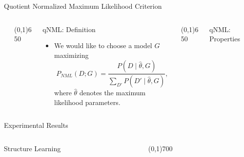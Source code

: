 \documentclass[final]{beamer}
\newcommand{\heading}[1]{\alert{\large #1}\\}
\theoremstyle{plain}
\begin{document}
\begin{frame}{}
\begin{block}{Quotient Normalized Maximum Likelihood Criterion}
\begin{columns}[T]
\begin{column}{0.18\textwidth}
   \end{column}
   
   \begin{column}{0.005\textwidth}\linethickness{0.3ex} %
      \color{myPurple} \line(0,1){650}
   \end{column} %
   
   \begin{column}{0.3\textwidth} %
	\heading{qNML: Definition}
	\vspace*{12pt}
	\begin{itemize}
	\item We would like to choose a model $G$ maximizing	
	\begin{equation}
	P_{NML}(D;G)=\frac{P(D \mid \hat\theta , G)}{\sum_{D'}{P(D' \mid \hat  \theta,G)}},
	\end{equation}where $\hat\theta$ denotes the maximum likelihood parameters.
	\end{itemize}
	
   \end{column}
   
   \begin{column}{0.005\textwidth}\linethickness{0.3ex} %
      \color{myPurple} \line(0,1){650}
   \end{column} %
   
   
   \begin{column}{0.25\textwidth}%
   
      \heading{qNML: Properties}
   
   \end{column} %
   
\end{columns}
\end{block}

\begin{block}{Experimental Results}
  \begin{columns}[T]
    \begin{column}{0.35\textwidth}
      \heading{Structure Learning}

    \end{column}
   \begin{column}{0.005\textwidth}\linethickness{0.3ex}
      \color{myPurple} \line(0,1){700}
   \end{column} %
   

\end{columns}
\end{block}
\end{frame}
\end{document}
